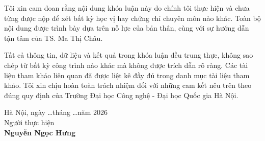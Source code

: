 Tôi xin cam đoan rằng nội dung khóa luận này do chính tôi thực hiện và chưa từng được nộp để xét bất kỳ học vị hay chứng chỉ chuyên môn nào khác. Toàn bộ nội dung được trình bày dựa trên nỗ lực của bản thân, cùng với sự hướng dẫn tận tâm của TS. Ma Thị Châu.

Tất cả thông tin, dữ liệu và kết quả trong khóa luận đều trung thực, không sao chép từ bất kỳ công trình nào khác mà không được trích dẫn rõ ràng. Các tài liệu tham khảo liên quan đã được liệt kê đầy đủ trong danh mục tài liệu tham khảo. Tôi xin chịu hoàn toàn trách nhiệm đối với những cam kết nêu trên theo đúng quy định của Trường Đại học Công nghệ - Đại học Quốc gia Hà Nội.

\begin{flushright}
\begin{minipage}{0.5\textwidth}
Hà Nội, ngày \ldots tháng \ldots năm 2026 \\[1em]
\centering Người thực hiện \\[2cm]
\centering
\textbf{Nguyễn Ngọc Hưng}
\end{minipage}
\end{flushright}
